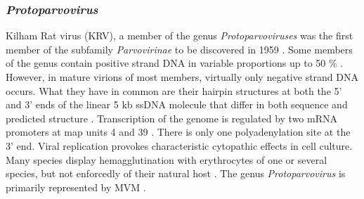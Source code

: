 

\subsubsection{\textit{Protoparvovirus}}
Kilham Rat virus (KRV), a member of the genus \textit{Protoparvoviruses} was the first member of the subfamily \textit{Parvovirinae} to be discovered in 1959 \cite{pmid13669314}. Some members of the genus contain positive strand DNA in variable proportions up to 50 \% \cite{pmid6694260}. However, in mature virions of most members, virtually only negative strand DNA occurs. What they have in common are their hairpin structures at both the 5’ and 3’ ends of the linear 5 kb ssDNA molecule that differ in both sequence and predicted structure \cite{pmid6298737}. Transcription of the genome is regulated by two mRNA promoters at map units 4 and 39 \cite{pmid6828378}. There is only one polyadenylation site at the 3’ end. 
Viral replication provokes characteristic cytopathic effects in cell culture. Many species display hemagglutination with erythrocytes of one or several species, but not enforcedly of their natural host \cite{pmid5083410}. The genus \textit{Protoparvovirus} is primarily represented by MVM \cite{icvt, protoparvovirus}.       


